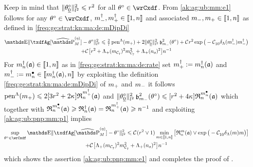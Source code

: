 \begin{pro}Keep in mind that
  $\Vnormlp{\xdf_{\underline{0}}}^2\leq\xdfCr^2$ for all $\xdf\in\rwCxdf$.
From
\eqref{ak:ag:ub:mm:e1} follows for any $\xdf\in\rwCxdf$, $\mdDi,\pdDi\in\nset{1,n}$ and associated
$\mDi,\pDi\in\nset{1,n}$ as defined in  \eqref{freq:ge:strat:kn:ma:de:mDipDi}%
 \begin{multline}\label{ak:ag:ub:pnp:mm:p1}
    \E\Vnormlp{\txdfAg[{\erWe[]}]-\xdf}^2\leq \tfrac{2}{7}\penSv[\pDi]
    +2\Vnormlp{\xdf_{\underline{0}}}^2\bias[\mDi]^2(\xdf)
 + \cst{}\xdfCr^2
 \exp\big(-\cst{10}\cmiSv[\mdDi]\mdDi\big)%
\\ +\cst{}\big[%
 \xdfCr^2+\miSv[\Di_{\cst{7}}]^2\Di_{\cst{7}}^2+\miSv[\ssY_{o}]^2 \big]\ssY^{-1}%
\end{multline}
 For $\aDi{\ssY}(\xdfCw[])\in\nset{1,n}$
as in \ref{freq:ge:strat:kn:ma:de:rate}  set $\pdDi:=\aDi{\ssY}(\xdfCw[])$ and $\mdDi:=\sDi{\ssY}\in\nset{\aDi{\ssY}(\xdfCw[]),\ssY}$ by exploiting the definition
\eqref{freq:ge:strat:kn:ma:de:mDipDi} of $\pDi$ and $\mDi$ it follows
$\penSv[\pDi] \leq 2[3\xdfCr^2+ 2\cpen]
\daRa{\pdDi}{(\xdfCw[])}$ and 
$\Vnormlp{\xdf_{\underline{0}}}^2\bias[\mDi]^2(\xdf)\leq
      [\xdfCr^2+4\cpen]\daRa{\sDi{\ssY}}{(\xdfCw[])}$
which together with
$\daRa{\sDi{\ssY}}{(\xdfCw[])}\geq\naRa{(\xdfCw[])}=\daRa{\pdDi}{(\xdfCw[])}\geq\ssY^{-1}$
and exploiting 
\eqref{ak:ag:ub:pnp:mm:p1} implies%
 \begin{multline}\label{ak:ag:ub:pnp:mm:p2}
   \sup_{\xdf\in\rwCxdf}\E\Vnormlp{\txdfAg[{\erWe[]}]-\xdf}^2%
    \leq 
   \cst{}(\xdfCr^2\vee1)\min_{\Di\in\nset{1,\ssY}}\big[\daRa{\Di}{(\xdfCw[])}\vee\exp\big(-\cst{10}\cmiSv\Di\big)\big]\\
   +\cst{}\big[\miSv[\Di_{\cst{7}}]^2\Di_{\cst{7}}^2+\miSv[\ssY_{o}]^2 \big]\ssY^{-1}
\end{multline}
which shows the assertion \eqref{ak:ag:ub:pnp:mm:e1} and  completes the
proof of .\proEnd\end{pro}

